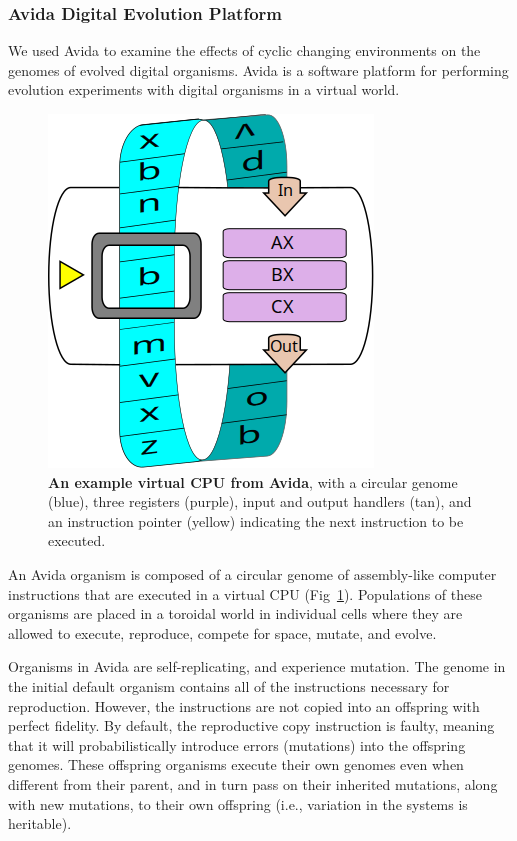 \documentclass[10pt,letterpaper]{article}
\begin{document}
\subsubsection*{Avida Digital Evolution Platform}
We used Avida \cite{lenski_evolutionary_2003} to examine the effects of cyclic changing environments on the genomes of evolved digital organisms. Avida is a software platform for performing evolution experiments with digital organisms in a virtual world.

\begin{figure}[!h]
\includegraphics[width=0.5\columnwidth]{figures/squishedCPU_extra.png}
\caption{{\bf An example virtual CPU from Avida}, with a circular genome (blue), three registers (purple), input and output handlers (tan), and an instruction pointer (yellow) indicating the next instruction to be executed.%
}\label{fig:cpu}
\end{figure}

An Avida organism is composed of a circular genome of assembly-like computer instructions that are executed in a virtual CPU (Fig~\ref{fig:cpu}). Populations of these organisms are placed in a toroidal world in individual cells where they are allowed to execute, reproduce, compete for space, mutate, and evolve.

Organisms in Avida are self-replicating, and experience mutation. The genome in the initial default organism contains all of the instructions necessary for reproduction. However, the instructions are not copied into an offspring with perfect fidelity. By default, the reproductive copy instruction is faulty, meaning that it will probabilistically introduce errors (mutations) into the offspring genomes. These offspring organisms execute their own genomes even when different from their parent, and in turn pass on their inherited mutations, along with new mutations, to their own offspring (i.e., variation in the systems is heritable).
\end{document}
